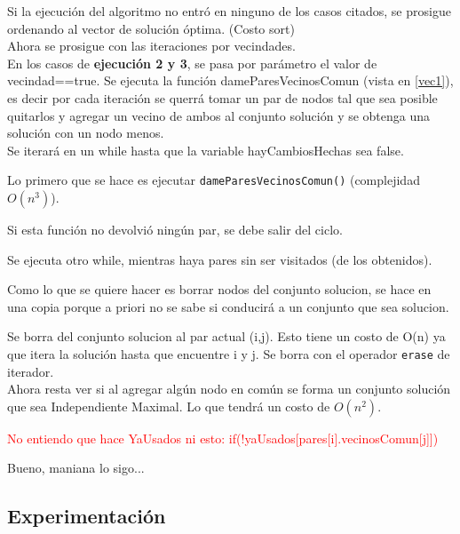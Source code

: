 Si la ejecuci\'on del algoritmo no entr\'o en ninguno de los casos citados, se prosigue ordenando al vector de soluci\'on \'optima. (Costo sort)\\

Ahora se prosigue con las iteraciones por vecindades.\\

En los casos de \textbf{ejecuci\'on 2 y 3}, se pasa por par\'ametro el valor de vecindad==true. Se ejecuta la funci\'on dameParesVecinosComun (vista en \ref{vec1}), es decir por cada iteraci\'on se querr\'a tomar un par de nodos tal que sea posible quitarlos y agregar un vecino de ambos al conjunto soluci\'on y se obtenga una soluci\'on con un nodo menos.\\

Se iterar\'a en un while hasta que la variable hayCambiosHechas sea false.


Lo primero que se hace es ejecutar \texttt{dameParesVecinosComun()} (complejidad $O(n^3)$).

Si esta funci\'on no devolvi\'o ning\'un par, se debe salir del ciclo.

Se ejecuta otro while, mientras haya pares sin ser visitados (de los obtenidos).

Como lo que se quiere hacer es borrar nodos del conjunto solucion, se hace en una copia porque a priori no se sabe si conducir\'a a un conjunto que sea solucion. 

Se borra del conjunto solucion al par actual (i,j). Esto tiene un costo de O(n) ya que itera la soluci\'on hasta que encuentre i y j. Se borra con el operador \texttt{erase} de iterador.\\

Ahora resta ver si al agregar alg\'un nodo en com\'un se forma un conjunto soluci\'on que sea Independiente Maximal. Lo que tendr\'a un costo de $O(n^2)$.

\textcolor{red}{No entiendo que hace YaUsados ni esto: if(!yaUsados[pares[i].vecinosComun[j]])}

Bueno, maniana lo sigo...

\newpage
\subsection{Experimentaci\'on}

